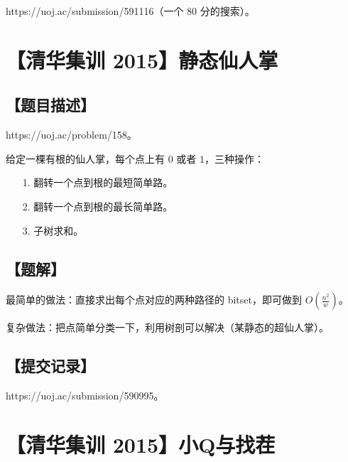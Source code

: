 \documentclass[UTF8,12pt,a4paper]{ctexart}
\begin{document}
	https://uoj.ac/submission/591116（一个 80 分的搜索）。
	
	
	
	\section*{【清华集训 2015】静态仙人掌}
	
	\subsection*{【题目描述】}
	
	https://uoj.ac/problem/158。
	
	给定一棵有根的仙人掌，每个点上有 $0$ 或者 $1$，三种操作：
	
	\begin{itemize}
		\item [1.] 翻转一个点到根的最短简单路。
		\item [2.] 翻转一个点到根的最长简单路。
		\item [3.] 子树求和。
	\end{itemize}
	
	\subsection*{【题解】}
	
	最简单的做法：直接求出每个点对应的两种路径的 bitset，即可做到 $O(\frac {n^2}{w})$。
	
	复杂做法：把点简单分类一下，利用树剖可以解决（某静态的超仙人掌）。
	
	\subsection*{【提交记录】}
	
	https://uoj.ac/submission/590995。
	
	
	\section*{【清华集训 2015】小Q与找茬}
	
\end{document}
